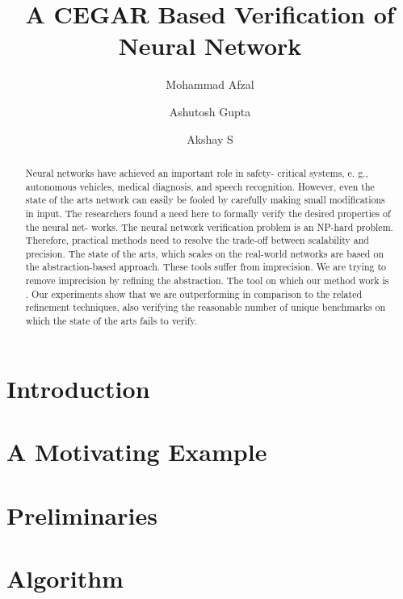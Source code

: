 \documentclass[10pt]{llncs}
\title{A CEGAR Based Verification of Neural Network}
\author{Mohammad Afzal\inst{1,2}\and Ashutosh Gupta\inst{1}\and Akshay S\inst{1}}
\institute{Indian Institute of Technology, Bombay, India\and TCS Research, Pune, India}
\begin{document}
\maketitle

\begin{abstract}
       Neural networks have achieved an important role in safety-
       critical systems, e. g., autonomous vehicles, medical diagnosis, and speech
       recognition. However, even the state of the arts network can easily be
       fooled by carefully making small modifications in input. The researchers
       found a need here to formally verify the desired properties of the neural net-
       works. The neural network verification problem is an NP-hard problem.
       Therefore, practical methods need to resolve the trade-off between scalability and precision. The state of the arts, which scales on the real-world
       networks are based on the abstraction-based approach. These tools suffer
       from imprecision. We are trying to remove imprecision by refining the
       abstraction. The tool on which our method work is \deeppoly{}. Our experiments show that we are outperforming in comparison to the related
       refinement techniques, also verifying the reasonable number of unique
       benchmarks on which the state of the arts fails to verify. 
\end{abstract}

\section{Introduction}
\label{sec:intro}



\section{A Motivating Example}
\label{sec:motivation}


\section{Preliminaries}
\label{sec:model}




\section{Algorithm}
\label{sec:algo}

\end{document}
